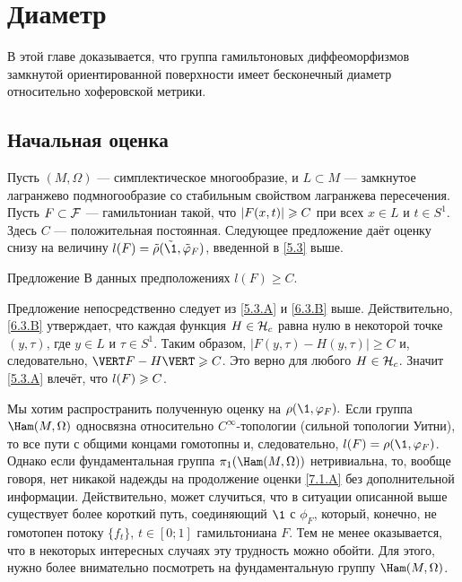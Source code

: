 \chapter{Диаметр}

В этой главе доказывается, что группа гамильтоновых диффеоморфизмов замкнутой ориентированной поверхности имеет бесконечный диаметр относительно хоферовской метрики.

\section{Начальная оценка}
Пусть $(M, \Omega)$ --- симплектическое многообразие, и $L \subset M$ --- замкнутое лагранжево подмногообразие со стабильным свойством  лагранжева пересечения.
Пусть $F \subset \mathcal{F}$ --- гамильтониан такой, что $| F (x, t) | \z\ge C$ при всех $x \in L$ и $t \in S^1$.
Здесь $C$ --- положительная постоянная.
Следующее предложение даёт оценку снизу на величину $l (F) \z= \tilde\rho (\tilde\1, \tilde\phi_F)$, введенной в \ref{5.3} выше.

\begin{thm}{Предложение}\label{7.1.A}
В данных предположениях $l (F) \ge C$.
\end{thm}

Предложение непосредственно следует из \ref{5.3.A} и \ref{6.3.B} выше.
Действительно, \ref{6.3.B} утверждает, что каждая функция $H \in \mathcal{H}_c$ равна нулю в некоторой точке $(y, \tau)$, где $y \in L$ и $\tau \in S^1$.
Таким образом, $| F (y, \tau) - H (y, \tau) | \ge C$ и, следовательно, $\VERT F - H \VERT \z\ge C$.
Это верно для любого $H \in \mathcal{H}_c$.
Значит \ref{5.3.A} влечёт, что $l (F) \z\ge C$.
\qeds

Мы хотим распространить полученную оценку на $\rho (\1, \phi_F).$
Если группа $\Ham (M, \Omega)$ односвязна относительно $C^\infty$-топологии (сильной топологии Уитни), то все пути с общими концами гомотопны и, следовательно, $l (F) = \rho (\1, \phi_F)$.
Однако если фундаментальная группа $\pi_1 (\Ham (M, \Omega))$ нетривиальна, то, вообще говоря, нет никакой надежды на продолжение оценки \ref{7.1.A} без дополнительной информации.
Действительно, может случиться, что в ситуации описанной выше существует более короткий путь, соединяющий $\1$ с $\phi_F$, который, конечно, не гомотопен потоку $\{f_t\}$, $t \in [0; 1]$ гамильтониана $F$.
Тем не менее оказывается, что в некоторых интересных случаях эту трудность можно обойти.
Для этого, нужно более внимательно посмотреть на фундаментальную группу $\Ham (M, \Omega)$.

